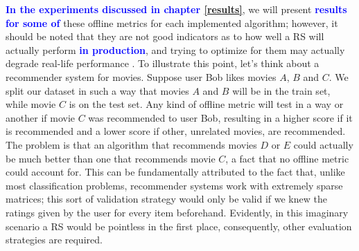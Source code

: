 \documentclass[cic,tc,english]{iiufrgs}
\newcommand{\adriano}[1]{\textcolor{blue}{\textbf{#1}}}
\begin{document}
\adriano{In the experiments discussed in chapter \ref{results}}, we will present \adriano{results for some of }these offline metrics for each implemented algorithm; however, it should be noted that they are not good indicators as to how well a RS will actually perform \adriano{in production}, and trying to optimize for them may actually degrade real-life performance \cite{McNee2006}. To illustrate this point, let's think about a recommender system for movies. Suppose user Bob likes movies $A$, $B$ and $C$. We split our dataset in such a way that movies $A$ and $B$ will be in the train set, while movie $C$ is on the test set. Any kind of offline metric will test in a way or another if movie $C$ was recommended to user Bob, resulting in a higher score if it is recommended and a lower score if other, unrelated movies, are recommended. The problem is that an algorithm that recommends movies $D$ or $E$ could actually be much better than one that recommends movie $C$, a fact that no offline metric could account for. This can be fundamentally attributed to the fact that, unlike most classification problems, recommender systems work with extremely sparse matrices; this sort of validation strategy would only be valid if we knew the ratings given by the user for every item beforehand. Evidently, in this imaginary scenario a RS would be pointless in the first place, consequently, other evaluation strategies are required.
\end{document}
